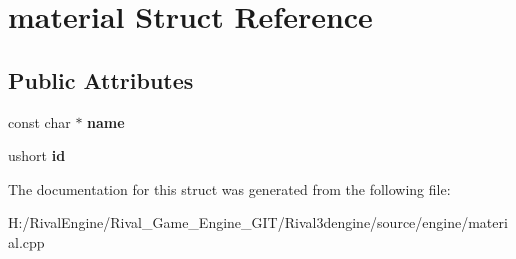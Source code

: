 \hypertarget{structmaterial}{}\section{material Struct Reference}
\label{structmaterial}
\subsection*{Public Attributes}
\begin{DoxyCompactItemize}
\item 
\mbox{\label{structmaterial_a6c9702db8ba10025c20efb81a96ce976}} 
const char $\ast$ {\bfseries name}
\item 
\mbox{\label{structmaterial_abc929bc37337eb254a3309c72f1347ad}} 
ushort {\bfseries id}
\end{DoxyCompactItemize}


The documentation for this struct was generated from the following file\+:\begin{DoxyCompactItemize}
\item 
H\+:/\+Rival\+Engine/\+Rival\+\_\+\+Game\+\_\+\+Engine\+\_\+\+G\+I\+T/\+Rival3dengine/source/engine/material.\+cpp\end{DoxyCompactItemize}

